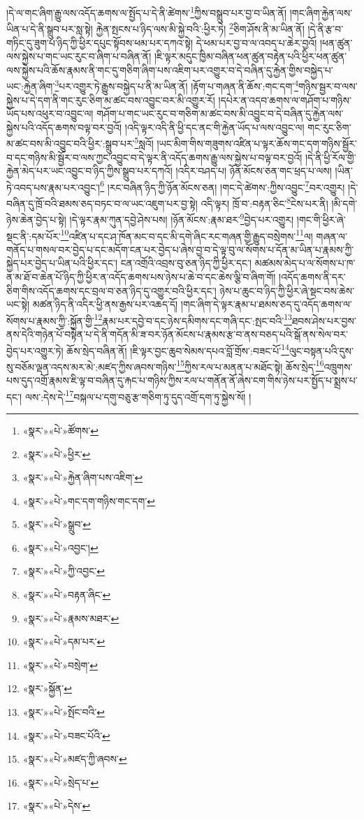 །དེ་ལ་གང་ཞིག་རྒྱུ་ལས་འདོད་ཆགས་ལ་སྤྱོད་པ་དེ་ནི་ཚེགས་\footnote{«སྣར་»«པེ་»ཚོགས་}ཀྱིས་བསྒྲུབ་པར་བྱ་བ་ཡིན་ནོ། །གང་ཞིག་རྐྱེན་ལས་ཡིན་པ་དེ་ནི་སྒྲུབ་པར་སླ་སྟེ། རྐྱེན་སྤངས་པ་ཉིད་ལས་མི་སྐྱེ་བའི་:ཕྱིར་ཏེ། \footnote{«སྣར་»«པེ་»ཕྱིར་}ཅིག་ཤོས་ནི་མ་ཡིན་ནོ། །དེ་ནི་རྩ་བ་གཏིང་དུ་ཟུག་པ་ཉིད་ཀྱི་ཕྱིར་དཔུང་སྟོབས་ཕམ་པར་དཀའ་སྟེ། དེ་ཕམ་པར་བྱ་བ་ལ་འབད་པ་ཆེར་བྱའོ། །ཕན་ཚུན་ལས་སྐྱེས་པ་གང་ཡང་རུང་བ་ཞིག་པ་བཞིན་ནོ། །ཇི་ལྟར་མདུང་ཁྱིམ་བཞིན་ཕན་ཚུན་བརྟེན་པའི་ཕྱིར་ཕན་ཚུན་ལས་སྐྱེས་པའི་ཆོས་རྣམས་ནི་གང་དུ་གཅིག་ཞིག་པས་འཇིག་པར་འགྱུར་བ་དེ་བཞིན་དུ་རྐྱེན་གྱིས་བསྐྱེད་པ་ཡང་:རྐྱེན་ཞིག་\footnote{«སྣར་»«པེ་»རྐྱེན་ཞིག་པས་འཇིག་}པར་འགྱུར་ཏེ་རྒྱུས་བསྐྱེད་པ་ནི་མ་ཡིན་ནོ། །རྟོག་པ་གཞན་ནི་ཆོས་:གང་དག་\footnote{«སྣར་»«པེ་»གང་དག་གཉིས་གང་དག་}གཉིས་སྦྱར་བ་ལས་སྐྱེས་པ་དེ་དག་ནི་གང་རུང་ཅིག་མ་ཚང་བས་འབྱུང་བར་མི་འགྱུར་རོ། །དཔེར་ན་འདབ་ཆགས་ལ་གཤོག་པ་གཉིས་ཡོད་པས་འཕུར་བ་འབྱུང་ལ། གཤོག་པ་གང་ཡང་རུང་བ་གཅིག་མ་ཚང་བས་མི་འབྱུང་བ་དེ་བཞིན་དུ་རྐྱེན་ལས་སྐྱེས་པའི་འདོད་ཆགས་བལྟ་བར་བྱའོ། །འདི་ལྟར་འདི་ནི་ཕྱི་དང་ནང་གི་རྐྱེན་ཡོད་པ་ལས་འབྱུང་ལ། གང་རུང་ཅིག་མ་ཚང་བས་མི་འབྱུང་བའི་ཕྱིར་:སྒྲུབ་པར་\footnote{«སྣར་»«པེ་»སྒྲུབ་}སླའོ། །ཡང་མིག་གིས་གཟུགས་འཛིན་པ་ལྟར་ཆོས་གང་དག་གཉིས་སྦྱོར་བ་དང་གཉིས་མི་སྦྱོར་བ་ལས་ཀྱང་འབྱུང་བ་དེ་ལྟར་ནི་འདོད་ཆགས་རྒྱུ་ལས་སྐྱེས་པ་བལྟ་བར་བྱའོ། །དེ་ནི་ཕྱི་རོལ་གྱི་རྐྱེན་མེད་པར་ཡང་འབྱུང་བ་ཉིད་ཀྱིས་སྒྲུབ་པར་དཀའོ། །འདིར་བཤད་པ། ཉོན་མོངས་ཅན་གང་ཕྲད་པ་ལས། །ཡིན་ཏེ་འབད་པས་རྣམ་པར་འབྱུང་།\footnote{«སྣར་»«པེ་»འབྱང་།} །རང་བཞིན་ཉིད་ཀྱི་ཉོན་མོངས་ཅན། །གང་དེ་ཚེགས་:ཀྱིས་འབྱུང་\footnote{«སྣར་»«པེ་»ཀྱི་འབྱང་}བར་འགྱུར། །དེ་བཞིན་དུ་ཁྲོ་བའི་ཐམས་ཅད་བཏང་བ་ལ་ཡང་འཇུག་པར་བྱ་སྟེ། འདི་ལྟར། ཁྲོ་བ་:བརྟན་ཅིང་\footnote{«སྣར་»«པེ་»བརྟན་ཞིང་}ངེས་པར་ནི། །མི་དགེ་ཉེས་ཆེན་བྱེད་པ་སྟེ། །དེ་ལྟར་རྣམ་ཀུན་དབྱེ་ཤེས་པས། །ཉོན་མོངས་:རྣམ་ཐར་\footnote{«སྣར་»«པེ་»རྣམས་མཐར་}བྱེད་པར་འགྱུར། །གང་གི་ཕྱིར་ཞེ་སྡང་ནི་:དམ་པོར་\footnote{«སྣར་»«པེ་»དམ་པར་}འཛིན་པ་དང་ཤ་ཁོན་མང་བ་དང་མི་དགེ་ཞིང་རང་གཞན་གྱི་རྒྱུད་བསྲེགས་\footnote{«སྣར་»«པེ་»བསྲེག་}ལ། གཞན་ལ་གནོད་པ་གསལ་བར་བྱེད་པ་དང་མདོག་ངན་པར་བྱེད་པ་ཞེས་བྱ་བ་དེ་ལྟ་བུ་ལ་སོགས་པ་དོན་མ་ཡིན་པ་རྣམས་ཀྱི་སྐྱེད་པར་བྱེད་པ་ཡིན་པའི་ཕྱིར་དང་། ངན་འགྲོའི་འབྲས་བུ་ཅན་ཉིད་ཀྱི་ཕྱིར་དང་། མཚམས་མེད་པ་ལ་སོགས་པ་ཁ་ན་མ་ཐོ་བ་ཆེན་པོ་ཉིད་ཀྱི་ཕྱིར་ན་འདོད་ཆགས་པས་ཉེས་པ་ཆེ་བ་དང་ཆེས་ལྕི་བ་ཞིག་གོ། །འདོད་ཆགས་ནི་དར་ཅིག་གིས་འདོད་ཆགས་དང་བྲལ་བ་ཅན་ཉིད་དུ་འགྱུར་བའི་ཕྱིར་དང་། ཉེས་པ་ཆུང་བ་ཉིད་ཀྱི་ཕྱིར་ཞེ་སྡང་བས་ཆེས་ཡང་སྟེ། མཚན་ཉིད་ནི་འདིར་ཕྱི་ནས་རྒྱས་པར་འཆད་དོ། །གང་ཞིག་དེ་ལྟར་རྣམ་པ་ཐམས་ཅད་དུ་འདོད་ཆགས་ལ་སོགས་པ་རྣམས་ཀྱི་:སྐྱོན་གྱི་\footnote{«སྣར་»སྐྱོན་}རྣམ་པར་དབྱེ་བ་དང་ཉེས་དམིགས་དང་གཞི་དང་:སྤང་བའི་\footnote{«སྣར་»«པེ་»སྤོང་བའི་}ཐབས་ཤེས་པར་བྱས་ནས་དེའི་གཉེན་པོ་བསྟེན་པ་དེ་ནི་གདོན་མི་ཟ་བར་ཉོན་མོངས་པ་རྣམས་རྩ་བ་ནས་བཅད་པའི་སྒོ་ནས་སེལ་བར་བྱེད་པར་འགྱུར་ཏེ། ཆོས་སྲེད་བཞིན་ནོ། །ཇི་ལྟར་བྱང་ཆུབ་སེམས་དཔའ་བློ་གྲོས་:བཟང་པོ་\footnote{«སྣར་»«པེ་»བཟང་པོའི་}ལུང་བསྟན་པའི་དུས་སུ་བཅོམ་ལྡན་འདས་མར་མེ་:མཛད་ཀྱིས་ཞབས་གཉིས་\footnote{«སྣར་»«པེ་»མཛད་ཀྱི་ཞབས་}ཀྱིས་རལ་པ་མནན་པ་མཐོང་སྟེ། ཆོས་སྲེད་\footnote{«སྣར་»«པེ་»སྲེད་པ་}འཁྲུགས་པས་དུད་འགྲོ་རྣམས་ཇི་ལྟ་བ་བཞིན་དུ་རྐང་པ་གཉིས་ཀྱིས་རལ་པ་གནོན་ནོ་ཞེས་ངག་གིས་ཉེས་པར་སྤྱོད་པ་སྨྲས་པ་དང་། ལས་:དེས་དེ་\footnote{«སྣར་»«པེ་»དེས་}བསྐལ་པ་དགུ་བཅུ་རྩ་གཅིག་ཏུ་དུད་འགྲོ་དག་ཏུ་སྐྱེས་སོ། །

